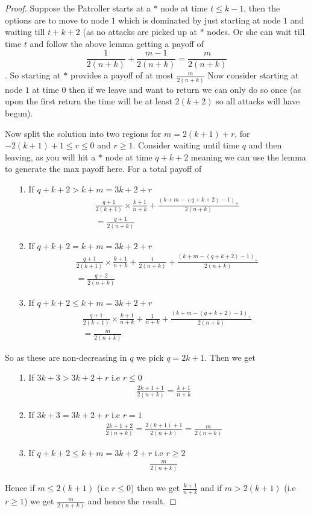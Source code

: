 \documentclass[a4paper,10pt]{article}
\newcommand{\pospart}[1]{\left( #1 \right)_{+}}
\theoremstyle{definition}
\theoremstyle{definition}
\theoremstyle{remark}
\theoremstyle{definition}
\begin{document}
\begin{proof}
Suppose the Patroller starts at a $*$ node at time $t \leq k-1$, then the options are to move to node $1$ which is dominated by just starting at node $1$ and waiting till $t+k+2$ (as no attacks are picked up at $*$ nodes. Or she can wait till time $t$ and follow the above lemma getting a payoff of
$$\frac{1}{2(n+k)}+\frac{m-1}{2(n+k)}=\frac{m}{2(n+k)}$$. So starting at $*$ provides a payoff of at most $\frac{m}{2(n+k)}$
Now consider starting at node $1$ at time $0$ then if we leave and want to return we can only do so once (as upon the first return the time will be at least $2(k+2)$ so all attacks will have begun).

Now split the solution into two regions for $m=2(k+1)+r$, for $-2(k+1)+1 \leq r \leq 0$ and $r \geq 1$.
Consider waiting until time $q$ and then leaving, as you will hit a $*$ node at time $q+k+2$ meaning we can use the lemma to generate the max payoff here. For a total payoff of
\begin{itemize}
\item[1.] If $q+k+2 > k+m=3k+2+r$
\begin{align*}
&\frac{q+1}{2(k+1)} \times \frac{k+1}{n+k} + \frac{\pospart{k+m-(q+k+2)-1}}{2(n+k)} \\
&= \frac{q+1}{2(n+k)}  
\end{align*}
\item[2.] If $q+k+2=k+m=3k+2+r$
\begin{align*}
&\frac{q+1}{2(k+1)} \times \frac{k+1}{n+k}+\frac{1}{2(n+k)}
+\frac{\pospart{k+m-(q+k+2)-1}}{2(n+k)}\\
&= \frac{q+2}{2(n+k)}  
\end{align*}
\item[3.] If $q+k+2 \leq k+m=3k+2+r$
\begin{align*}
&\frac{q+1}{2(k+1)} \times \frac{k+1}{n+k}+\frac{1}{n+k}+\frac{\pospart{k+m-(q+k+2)-1}}{2(n+k)} \\
&= \frac{m}{2(n+k)}  
\end{align*}
\end{itemize}
So as these are non-decreasing in $q$ we pick $q=2k+1$.
Then we get 
\begin{itemize}
\item[1.] If $3k+3 > 3k+2+r$ i.e $r \leq 0$
\begin{align*}
\frac{2k+1+1}{2(n+k)}=\frac{k+1}{n+k}  
\end{align*}
\item[2.] If $3k+3=3k+2+r$ i.e $r=1$
\begin{align*}
\frac{2k+1+2}{2(n+k)}=\frac{2(k+1)+1}{2(n+k)}=\frac{m}{2(n+k)}  
\end{align*}
\item[3.] If $q+k+2 \leq k+m=3k+2+r$ i.e $r \geq 2$
\begin{align*}
\frac{m}{2(n+k)}  
\end{align*}
\end{itemize}

Hence if $m \leq 2(k+1)$ (i.e $r \leq 0$) then we get $\frac{k+1}{n+k}$ and if $m > 2(k+1)$ (i.e $r \geq 1 $) we get $\frac{m}{2(n+k)}$ and hence the result.
\end{proof}
\end{document}
